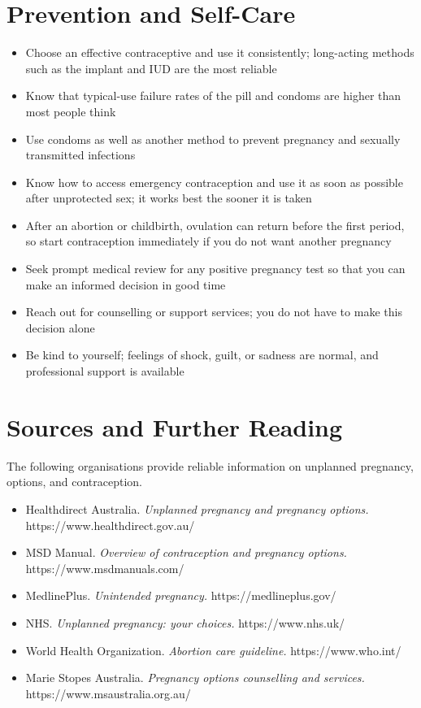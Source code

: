 \section*{Prevention and Self-Care}
\begin{itemize}
    \item Choose an effective contraceptive and use it consistently; long-acting methods such as the implant and IUD are the most reliable
    \item Know that typical-use failure rates of the pill and condoms are higher than most people think
    \item Use condoms as well as another method to prevent pregnancy and sexually transmitted infections
    \item Know how to access emergency contraception and use it as soon as possible after unprotected sex; it works best the sooner it is taken
    \item After an abortion or childbirth, ovulation can return before the first period, so start contraception immediately if you do not want another pregnancy
    \item Seek prompt medical review for any positive pregnancy test so that you can make an informed decision in good time
    \item Reach out for counselling or support services; you do not have to make this decision alone
    \item Be kind to yourself; feelings of shock, guilt, or sadness are normal, and professional support is available
\end{itemize}

\section*{Sources and Further Reading}
The following organisations provide reliable information on unplanned pregnancy, options, and contraception.

\begin{itemize}
    \item Healthdirect Australia. \textit{Unplanned pregnancy and pregnancy options.} https://www.healthdirect.gov.au/
    \item MSD Manual. \textit{Overview of contraception and pregnancy options.} https://www.msdmanuals.com/
    \item MedlinePlus. \textit{Unintended pregnancy.} https://medlineplus.gov/
    \item NHS. \textit{Unplanned pregnancy: your choices.} https://www.nhs.uk/
    \item World Health Organization. \textit{Abortion care guideline.} https://www.who.int/
    \item Marie Stopes Australia. \textit{Pregnancy options counselling and services.} https://www.msaustralia.org.au/
\end{itemize}

